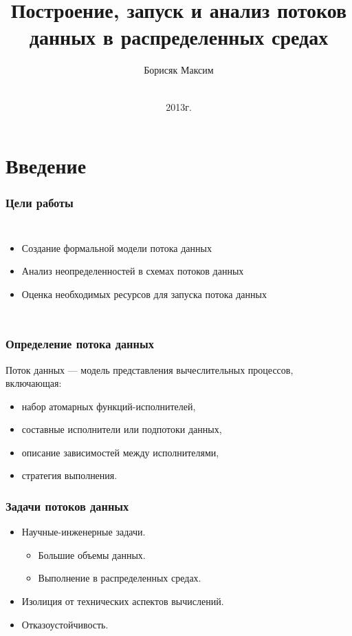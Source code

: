 \documentclass[10pt,pdf,hyperref={unicode}]{beamer}
\title{Построение, запуск и анализ потоков данных в распределенных средах}
\author{Борисяк Максим}
\institute{МФТИ
}
\date{
    \\
    2013г.
}
\begin{document}
\begin{frame}
  \maketitle
\end{frame}

\section{Введение}

\begin{frame}
  \frametitle{Цели работы}
 \begin{columns}
    \column{\textwidth}
     \begin{itemize}
        \item Создание формальной модели потока данных
        \item Анализ неопределенностей в схемах потоков данных
        \item Оценка необходимых ресурсов для запуска потока данных
    \end{itemize}
\end{columns}
\end{frame}

\begin{frame}
  \frametitle{Определение потока данных}
  Поток данных --- модель представления вычеслительных процессов, включающая:
  \begin{itemize}
    \item набор атомарных функций-исполнителей,
    \item составные исполнители или подпотоки данных,
    \item описание зависимостей между исполнителями,
    \item стратегия выполнения.
  \end{itemize}
\end{frame}

\begin{frame}
  \frametitle{Задачи потоков данных}
  \begin{itemize}
    \item Научные-инженерные задачи.
    \begin{itemize}
      \item Большие объемы данных.
      \item Выполнение в распределенных средах.
    \end{itemize}
    \item Изолиция от технических аспектов вычислений.
    \item Отказоустойчивость.
  \end{itemize}
\end{frame}
\end{document}
